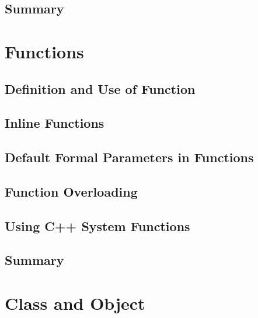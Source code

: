 \documentclass[a4paper]{article}
\begin{document}
\subsection{Summary}



\newpage
\section{Functions}
\subsection{Definition and Use of Function}

\subsection{Inline Functions}

\subsection{Default Formal Parameters in Functions}

\subsection{Function Overloading}

\subsection{Using C++ System Functions}

\subsection{Summary}


\newpage
\section{Class and Object}
\end{document}
